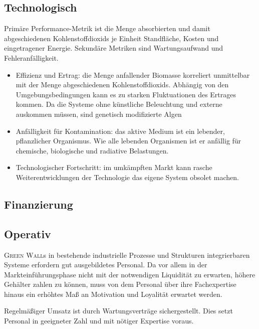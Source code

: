         \subsection{Technologisch}

            Primäre Performance-Metrik ist die Menge absorbierten und damit abgeschiedenen Kohlenstoffdioxids je Einheit Standfläche, Kosten und eingetragener Energie.
            Sekundäre Metriken sind Wartungsaufwand und Fehleranfälligkeit.
            \begin{itemize}
                \item Effizienz und Ertrag: die Menge anfallender Biomasse korreliert unmittelbar mit der Menge abgeschiedenen Kohlenstoffdioxids.
                Abhängig von den Umgebungsbedingungen kann es zu starken Fluktuationen des Ertrages kommen.
                Da die Systeme ohne künstliche Beleuchtung und externe  auskommen müssen, sind genetisch modifizierte Algen 
                \item Anfälligkeit für Kontamination: das aktive Medium ist ein lebender, pflanzlicher Organismus. Wie alle lebenden Organismen ist er anfällig für chemische, biologische und radiative Belastungen.
                \item Technologischer Fortschritt: im umkämpften Markt kann rasche Weiterentwicklungen der Technologie das eigene System obsolet machen.
            \end{itemize}
        \subsection{Finanzierung}

        \subsection{Operativ}
            \textsc{Green Wall}s in bestehende industrielle Prozesse und Strukturen integrierbaren Systeme erfordern gut ausgebildetes Personal.
            Da vor allem in der Markteinführungsphase nicht mit der notwendigen Liquidität zu erwarten, höhere Gehälter zahlen zu können, muss von dem Personal über ihre Fachexpertise hinaus ein erhöhtes Maß an Motivation und Loyalität erwartet werden.\par\medskip

            Regelmäßiger Umsatz ist durch Wartungsverträge sichergestellt.
            Dies setzt Personal in geeigneter Zahl und mit nötiger Expertise voraus.
    
